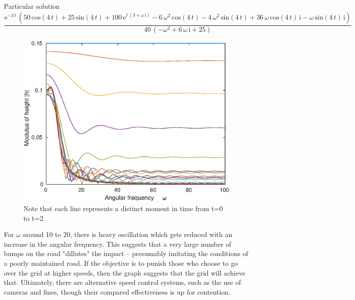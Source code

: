 Particular solution
\begin{equation}
    \frac{{\mathrm{e}}^{-3\,t} \,{\left(50\,\mathrm{cos}\left(4\,t\right)+25\,\mathrm{sin}\left(4\,t\right)+100\,{\mathrm{e}}^{t\,{\left(3+\omega\,\mathrm{i}\right)}} -6\,\omega^2 \,\mathrm{cos}\left(4\,t\right)-4\,\omega^2 \,\mathrm{sin}\left(4\,t\right)+36\,\omega\,\mathrm{cos}\left(4\,t\right)\,\mathrm{i}-\omega\,\mathrm{sin}\left(4\,t\right)\,\mathrm{i}\right)}}{40\,{\left(-\omega^2 +6\,\omega\,\mathrm{i}+25\right)}}
\end{equation}


\begin{figure}[h]
	\includegraphics[scale=0.65, center]{./eps/topic6_c.eps}
	\caption{Note that each line represents a distinct moment in time from t=0 to t=2}
	\label{fig:Topic6-b}
\end{figure}

For $\omega$ around 10 to 20, there is heavy oscillation which gets reduced with an increase in the angular frequency.
This suggests that a very large number of bumps on the road "dillutes" the impact -- presumably imitating the conditions of a poorly maintained road.
If the objective is to punish those who choose to go over the grid at higher speeds, then the graph suggests that the grid will achieve that.
Ultimately, there are alternative speed control systems, such as the use of cameras and fines, though their compared effectiveness is up for contention.

\pagebreak